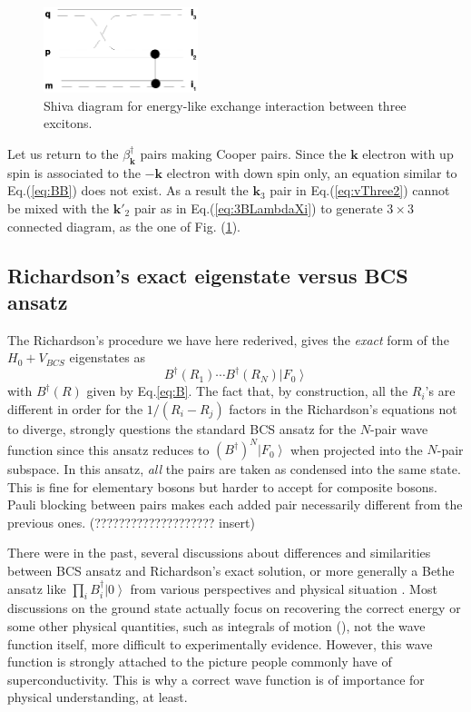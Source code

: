 \documentclass[epj]{svjour}
\newcommand{\vk}{\ensuremath{\mathbf{k}}}
\begin{document}
 
\begin{figure}[htb]
   \includegraphics[width=0.4\textwidth]{threeExciton.eps}
\caption{Shiva diagram for energy-like exchange interaction between three excitons.\label{fig:threeExciton} }
 \end{figure}


Let us return to the $\beta^\dagger_\vk$ pairs making Cooper pairs. Since the $\vk$ electron with up spin is associated to the $-\vk$ electron with down spin only, an equation similar to Eq.(\ref{eq:BB}) does not exist.  As a result the $\vk_3$ pair in Eq.(\ref{eq:vThree2}) cannot be mixed with the $\vk'_2$ pair as in Eq.(\ref{eq:3BLambdaXi}) to generate $3\times3$ connected diagram, as the one of Fig. (\ref{fig:threeExciton}).


\subsection{Richardson's exact eigenstate versus BCS ansatz}

The Richardson's procedure we have here rederived, gives the 
\emph{exact} form of the $H_0+V_{BCS}$ eigenstates as 
\begin{equation}
B^{\dagger}(R_1)\cdots{}B^{\dagger}(R_N)\left|F_0\right>  
\end{equation}
with $B^{\dagger}(R)$ given by Eq.\eqref{eq:B}. The fact that, by
construction, all the $R_i$'s are different in order for the $1/(R_i-R_j)$ factors in the Richardson's equations not to diverge, strongly questions the standard
BCS ansatz for the $N$-pair wave function since this ansatz reduces to $\left(B^{\dagger}\right)
^N\left|F_0\right> $ when projected into the $N$-pair subspace. In this ansatz,  \emph{all} the pairs are taken as condensed into the same state. This is fine for elementary bosons but harder to accept for composite bosons. Pauli blocking between pairs  makes each added pair necessarily different from the previous ones. (???????????????????? insert)

There were in the past, several discussions about differences and similarities between BCS ansatz and Richardson's exact solution, or more generally a Bethe ansatz like $\prod_iB^\dagger_i\left|0\right>$ from various perspectives and physical situation \cite{bang,hasegawa,Roman2002}.  Most discussions on the ground state actually  focus on recovering the correct energy or some other physical quantities, such as integrals of motion (\cite{ortiz}), not the wave function itself, more difficult to experimentally evidence. However, this wave function is strongly attached to the picture people commonly have of superconductivity. This is why a correct wave function is of importance for physical understanding, at least.
\end{document}
